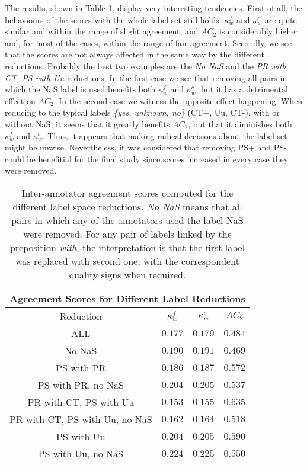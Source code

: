 The results, shown in Table \ref{tab:rediaa}, display very interesting tendencies. First of all, the behaviours of the scores with the whole label set still holds: $\kappa^{f}_{w}$ and $\kappa^{c}_{w}$ are quite similar and within the range of slight agreement, and $AC_2$ is considerably higher and, for most of the cases, within the range of fair agreement. Secondly, we see that the scores are not always affected in the same way by the different reductions. Probably the best two examples are the \textit{No NaS} and the \textit{PR with CT, PS with Uu} reductions. In the first case we see that removing all pairs in which the NaS label is used benefits both $\kappa^{f}_{w}$ and $\kappa^{c}_{w}$, but it has a detrimental effect on $AC_2$. In the second case we witness the opposite effect happening. When reducing to the typical labels \textit{\{yes, unknown, no\}} (CT+, Uu, CT-), with or without NaS, it seems that it greatly benefits $AC_2$, but that it diminishes both $\kappa^{f}_{w}$ and $\kappa^{c}_{w}$. Thus, it appears that making radical decisions about the label set might be unwise. Nevertheless, it was considered that removing PS+ and PS- could be benefitial for the final study since scores increased in every case they were removed.\\

\begin{table}
\centering
\begin{tabular}{|c|c|c|c|}
\hline
\multicolumn{4}{|c|}{Agreement Scores for Different Label Reductions}\\\hline
Reduction &  $\kappa^{f}_{w}$ & $\kappa^{c}_{w}$ & $AC_2$\\\hline
ALL & $0.177$ & $0.179$ & $0.484$\\\hline
No NaS & $0.190$ & $0.191$ & $0.469$ \\\hline
PS with PR & $0.186$ & $0.187$ & $0.572$\\\hline
PS with PR, no NaS & $0.204$ & $0.205$ & $0.537$\\\hline
PR with CT, PS with Uu & $0.153$ & $0.155$ & $0.635$\\\hline
PR with CT, PS with Uu, no NaS & $0.162$ & $0.164$ & $0.518$\\\hline
PS with Uu & $0.204$ & $0.205$ & $0.590$\\\hline
PS with Uu, no NaS & $0.224$ & $0.225$ & $0.550$\\\hline 
\end{tabular}
\caption[Inter-annotator agreement scores for different label reductions.]{Inter-annotator agreement scores computed for the different label space reductions. \textit{No NaS} means that all pairs in which any of the annotators used the label NaS were removed. For any pair of labels linked by the preposition \textit{with}, the interpretation is that the first label was replaced with second one, with the correspondent quality signs when required.}
\label{tab:rediaa}
\end{table}

